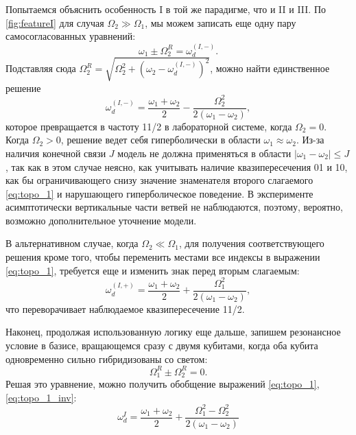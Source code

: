 \documentclass[14pt, a4paper]{extreport}
\numberwithin{equation}{section}
\begin{document}
Попытаемся объяснить особенность I в той же парадигме, что и II и III. По \autoref{fig:featureI} для случая $\Omega_2 \gg \Omega_1$, мы можем записать еще одну пару самосогласованных уравнений:
\begin{equation}
\omega_{1} \pm \Omega_2^R = \omega_d^{(I, -)}.
\end{equation}
Подставляя сюда $\Omega_2^R = \sqrt{\Omega_2^2 + \left(\omega_2 - \omega_d^{(I, -)}\right)^2}$, можно найти единственное решение
\begin{equation}
\omega_d^{(I, -)} = \frac{\omega_1 + \omega_2}{2} - \frac{ \Omega_{2}^{2}}{2 \left(\omega_{1} - \omega_{2}\right)},
\label{eq:topo_1}
\end{equation}
которое превращается в частоту 11/2 в лабораторной системе, когда $\Omega_2 = 0$. Когда $\Omega_2 > 0$, решение ведет себя гиперболически в области $\omega_1 \approx \omega_2$. Из-за наличия конечной связи $J$ модель не должна применяться в области $|\omega_1-\omega_2|\leq J$, так как в этом случае неясно, как учитывать наличие квазипересечения 01 и 10, как бы ограничивающего снизу значение знаменателя второго слагаемого \eqref{eq:topo_1} и нарушающего гиперболическое поведение. В эксперименте асимптотически вертикальные части ветвей не наблюдаются, поэтому, вероятно, возможно дополнительное уточнение модели.

В альтернативном случае, когда $\Omega_2 \ll \Omega_1$, для получения соответствующего решения кроме того, чтобы переменить местами все индексы в выражении \eqref{eq:topo_1}, требуется еще и изменить знак перед вторым слагаемым:
\begin{equation}
\omega_d^{(I,+)} = \frac{\omega_1 + \omega_2}{2} + \frac{ \Omega_{1}^{2}}{2 \left(\omega_{1} - \omega_{2}\right)},
\label{eq:topo_1_inv}
\end{equation}
что переворачивает наблюдаемое квазипересечение 11/2.

Наконец, продолжая использованную логику еще дальше, запишем резонансное условие в базисе, вращающемся сразу с двумя кубитами, когда оба кубита одновременно сильно гибридизованы со светом:
\begin{equation}
\Omega_1^R \pm \Omega_2^R = 0.
\label{eq:zero-photon}
\end{equation}
Решая это уравнение, можно получить обобщение выражений \eqref{eq:topo_1}, \eqref{eq:topo_1_inv}:
\begin{equation}
\omega_d^I = \frac{\omega_{1} + \omega_{2}}{2} + \frac{\Omega_{1}^{2} - \Omega_{2}^{2}}{ 2\left(\omega_{1} - \omega_{2}\right)}
\label{eq:topo_comm}
\end{equation}
\end{document}
